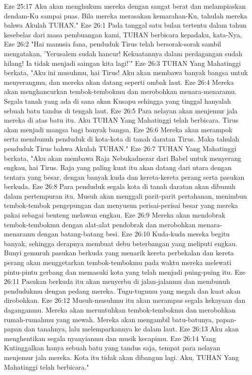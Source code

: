 Eze 25:17  Aku akan menghukum mereka dengan sangat berat dan melampiaskan dendam-Ku sampai puas. Bila mereka merasakan kemarahan-Ku, tahulah mereka bahwa Akulah TUHAN."
Eze 26:1  Pada tanggal satu bulan tertentu dalam tahun kesebelas dari masa pembuangan kami, TUHAN berbicara kepadaku, kata-Nya,
Eze 26:2  "Hai manusia fana, penduduk Tirus telah bersorak-sorak sambil mengatakan, 'Yerusalem sudah hancur! Kekuatannya dalam perdagangan sudah hilang! Ia tidak menjadi saingan kita lagi!'"
Eze 26:3  TUHAN Yang Mahatinggi berkata, "Aku ini musuhmu, hai Tirus! Aku akan membawa banyak bangsa untuk menyerangmu, dan mereka akan datang seperti ombak laut.
Eze 26:4  Mereka akan menghancurkan tembok-tembokmu dan merobohkan menara-menaramu. Segala tanah yang ada di sana akan Kusapu sehingga yang tinggal hanyalah sebuah batu tandus di tengah laut.
Eze 26:5  Para nelayan akan menjemur jala mereka di atas batu itu. Aku TUHAN Yang Mahatinggi telah berbicara. Tirus akan menjadi mangsa bagi banyak bangsa.
Eze 26:6  Mereka akan merampok serta membunuh penduduk di kota-kota di tanah daratan Tirus. Maka tahulah penduduk Tirus bahwa Akulah TUHAN."
Eze 26:7  TUHAN Yang Mahatinggi berkata, "Aku akan membawa Raja Nebukadnezar dari Babel untuk menyerang engkau, hai Tirus. Raja yang paling kuat itu akan datang dari utara dengan tentara yang besar, dengan banyak kuda dan kereta-kereta perang serta pasukan berkuda.
Eze 26:8  Para penduduk segala kota di tanah daratan akan dibunuh dalam pertempuran itu. Musuh akan menggali parit-parit pertahanan, menimbun tembok-tembok pengepungan dan menyusun perisai-perisai besar yang mereka pakai sebagai benteng melawan engkau.
Eze 26:9  Mereka akan mendobrak tembok-tembokmu dengan alat-alat pendobrak dan merobohkan menara-menaramu dengan batang-batang besi.
Eze 26:10  Kuda-kuda mereka begitu banyak, sehingga derapnya membuat debu beterbangan yang meliputi engkau. Bunyi gemuruh pasukan berkuda yang menarik kereta perbekalan dan kereta perang akan menggetarkan tembok-tembokmu pada waktu mereka melewati pintu-pintu gerbang dan memasuki kota yang telah menjadi puing-puing itu.
Eze 26:11  Pasukan berkuda itu akan menyerbu di jalan-jalanmu dan membunuh pendudukmu dengan pedang mereka. Tugu-tugumu yang megah dan kuat akan dirobohkan.
Eze 26:12  Musuh-musuhmu itu akan merampas segala kekayaan dan daganganmu. Mereka akan meruntuhkan tembok-tembokmu dan merobohkan rumah-rumahmu yang mewah. Mereka akan mengambil batu-batunya, papan-papan dan tanahnya, lalu melemparkannya ke dalam laut.
Eze 26:13  Aku akan menghentikan segala nyanyianmu dan musik kecapimu.
Eze 26:14  Yang Kutinggalkan hanya sebuah batu yang tandus saja, tempat para nelayan menjemur jala mereka. Kota itu tidak akan dibangun lagi. Aku, TUHAN Yang Mahatinggi telah berbicara."
